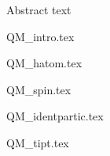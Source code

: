 \documentclass[oneside, 12pt, notitlepage]{book}
\begin{document}
\frontmatter
{}
\begin{notesabstract}[Abstract]
Abstract text
\end{notesabstract}
\mainmatter
\pagestyle{mynotespage}

{QM_intro.tex}

{QM_hatom.tex}

{QM_spin.tex}

{QM_identpartic.tex}

{QM_tipt.tex}



\backmatter

\end{document}
